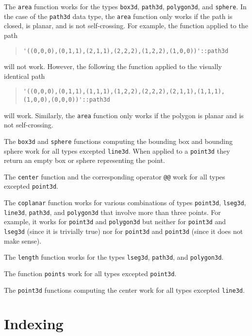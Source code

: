 \documentclass[10pt]{article}
\begin{document}
The \verb+area+ function works for the types \verb+box3d+, \verb+path3d+, 
\verb+polygon3d+, and \verb+sphere+. 
In the case of the \verb+path3d+ data type, the \verb+area+ function only works 
if the path is closed, is planar, and is not self-crossing. 
For example, the function applied to the path 
\begin{quote}
\begin{verbatim}
'((0,0,0),(0,1,1),(2,1,1),(2,2,2),(1,2,2),(1,0,0))'::path3d
\end{verbatim}
\end{quote}
will not work. However, the following the function applied to the visually identical path 
\begin{quote}
\begin{verbatim}
'((0,0,0),(0,1,1),(1,1,1),(1,2,2),(2,2,2),(2,1,1),(1,1,1),(1,0,0),(0,0,0))'::path3d
\end{verbatim}
\end{quote}
will work. Similarly, the \verb+area+ function only works 
if the polygon is planar and is not self-crossing. 

The \verb+box3d+ and \verb+sphere+ functions computing the bounding box and 
bounding sphere work for all types excepted \verb+line3d+. 
When applied to a \verb+point3d+ they return an empty box or sphere 
representing the point. 

The \verb+center+ function and the corresponding operator \verb+@@+ 
work for all types excepted \verb+point3d+.

The \verb+coplanar+ function works for various combinations of 
types \verb+point3d+, \verb+lseg3d+, \verb+line3d+, \verb+path3d+, and 
\verb+polygon3d+ that involve more than three points. For example,
it works for \verb+point3d+ and \verb+polygon3d+ but neither for
\verb+point3d+ and \verb+lseg3d+ (since it is trivially true)
nor for \verb+point3d+ and \verb+point3d+ (since it does not make sense).

The \verb+length+ function works for the types \verb+lseg3d+,
\verb+path3d+, and \verb+polygon3d+.

The function \verb+points+ work for all types excepted \verb+point3d+. 

The \verb+point3d+ functions 
computing the center work for all types excepted \verb+line3d+. 

\section{Indexing}
\end{document}
